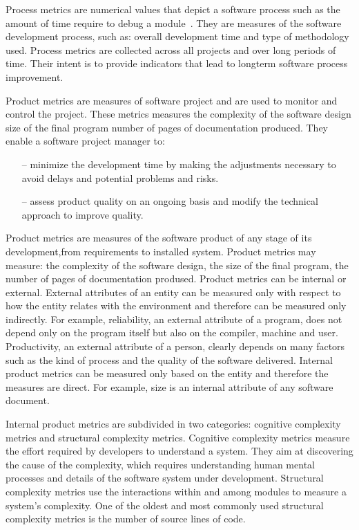 Process metrics are numerical values that depict a software process such as the amount of time require to debug a module~\cite{metrics2}. They are measures of the software development process, such as: overall development time and type of methodology used. Process metrics are collected across all projects and over long periods of time. Their intent is to provide indicators that lead to longterm software process improvement.

Product metrics are measures of software project and are used to monitor and control the project. These metrics measures the complexity of the software design size of the final program number of pages of documentation produced. They enable a software project manager to:

\begin{itemize}
	\item[--] minimize the development time by making the adjustments necessary to avoid delays
	and potential problems and risks.
	\item[--] assess product quality on an ongoing basis and modify the technical approach to improve
	quality.
\end{itemize}

Product metrics are measures of the software product of any stage of its development,from requirements to installed system. Product metrics may measure: the complexity of the software design, the size of the final program, the number of pages of documentation prodused.
Product metrics can be internal or external. External attributes of an entity can be measured only with respect to how the entity relates with the environment and therefore can be measured only indirectly. For example, reliability, an external attribute of a program, does not depend only on the program itself but also on the compiler, machine and user. Productivity, an external attribute of a person, clearly depends on many factors such as the kind of process and the quality of the software delivered. Internal product metrics can be measured only based on the entity and therefore the measures are direct. For example, size is an internal attribute of any software document.

Internal product metrics are subdivided in two categories: cognitive
complexity metrics and structural complexity metrics. Cognitive complexity metrics measure the effort required by developers to understand a system. They aim at discovering the cause of the complexity, which requires understanding human mental processes and details of the software system under development. Structural complexity metrics use the interactions within and among modules to measure a system’s complexity. One of the oldest and most commonly used structural complexity metrics is the number of source lines of code.

